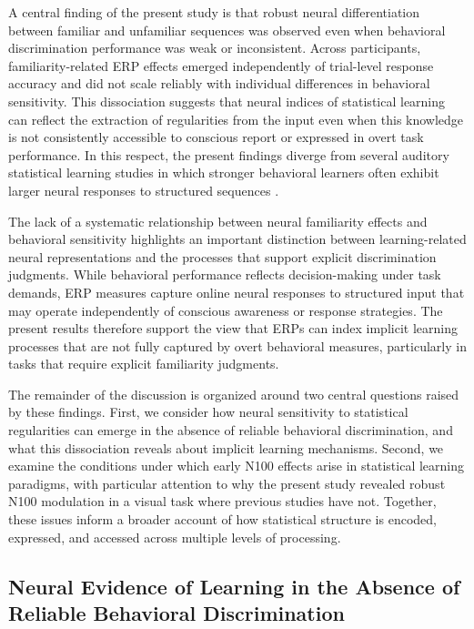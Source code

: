 A central finding of the present study is that robust neural differentiation between familiar and unfamiliar sequences was observed even when behavioral discrimination performance was weak or inconsistent. Across participants, familiarity-related ERP effects emerged independently of trial-level response accuracy and did not scale reliably with individual differences in behavioral sensitivity. This dissociation suggests that neural indices of statistical learning can reflect the extraction of regularities from the input even when this knowledge is not consistently accessible to conscious report or expressed in overt task performance. In this respect, the present findings diverge from several auditory statistical learning studies in which stronger behavioral learners often exhibit larger neural responses to structured sequences \cite{sandersSegmentingNonsenseEventrelated2002, ablaOnlineAssessmentStatistical2008}.

The lack of a systematic relationship between neural familiarity effects and behavioral sensitivity highlights an important distinction between learning-related neural representations and the processes that support explicit discrimination judgments. While behavioral performance reflects decision-making under task demands, ERP measures capture online neural responses to structured input that may operate independently of conscious awareness or response strategies. The present results therefore support the view that ERPs can index implicit learning processes that are not fully captured by overt behavioral measures, particularly in tasks that require explicit familiarity judgments.

The remainder of the discussion is organized around two central questions raised by these findings. First, we consider how neural sensitivity to statistical regularities can emerge in the absence of reliable behavioral discrimination, and what this dissociation reveals about implicit learning mechanisms. Second, we examine the conditions under which early N100 effects arise in statistical learning paradigms, with particular attention to why the present study revealed robust N100 modulation in a visual task where previous studies have not. Together, these issues inform a broader account of how statistical structure is encoded, expressed, and accessed across multiple levels of processing.

\subsection*{Neural Evidence of Learning in the Absence of Reliable Behavioral Discrimination}

